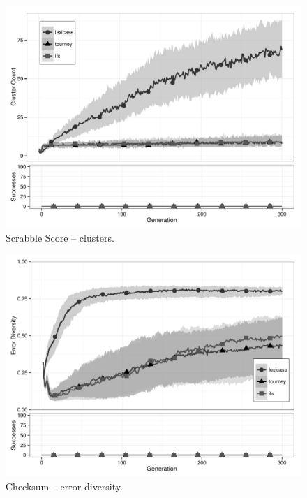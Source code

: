 \begin{figure}[p] %
\centering
\includegraphics[width=11.5cm]{scrabble-score-cluster.pdf}
\caption{Scrabble Score -- clusters.}
\label{scrabble-scoreClu}
\end{figure}

\begin{figure}[p] %
\centering
\includegraphics[width=11.5cm]{checksum-diversity.pdf}
\caption{Checksum -- error diversity.}
\label{checksumDiv}
\end{figure}

